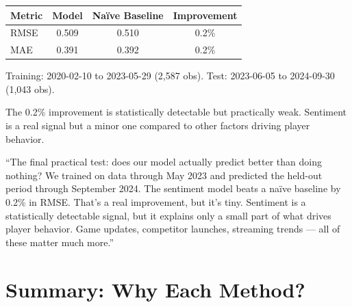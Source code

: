 \documentclass[11pt, letterpaper]{article}
\theoremstyle{definition}
\begin{document}
\begin{resultbox}
\begin{center}
\begin{tabular}{lccc}
\toprule
\textbf{Metric} & \textbf{Model} & \textbf{Naïve Baseline} & \textbf{Improvement} \\
\midrule
RMSE & 0.509 & 0.510 & 0.2\% \\
MAE  & 0.391 & 0.392 & 0.2\% \\
\bottomrule
\end{tabular}
\end{center}
Training: 2020-02-10 to 2023-05-29 (2,587 obs).
Test: 2023-06-05 to 2024-09-30 (1,043 obs).

The 0.2\% improvement is statistically detectable but practically weak.
Sentiment is a real signal but a minor one compared to other factors driving player behavior.
\end{resultbox}

\begin{speakerbox}
``The final practical test: does our model actually predict better than doing nothing?
We trained on data through May 2023 and predicted the held-out period through September 2024.
The sentiment model beats a naïve baseline by 0.2\% in RMSE.
That's a real improvement, but it's tiny.
Sentiment is a statistically detectable signal, but it explains only a small part of what drives player behavior.
Game updates, competitor launches, streaming trends --- all of these matter much more.''
\end{speakerbox}

\section{Summary: Why Each Method?}
\end{document}
